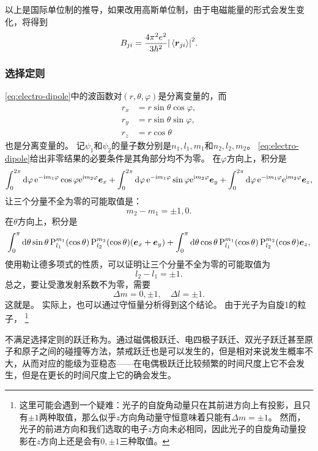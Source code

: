 以上是国际单位制的推导，如果改用高斯单位制，由于电磁能量的形式会发生变化，将得到
\begin{equation}
    B_{ji} = \frac{4\pi^2 e^2}{3 \hbar^2} \abs{\expval*{\vb*{r}_{ji}}}^2.
\end{equation}

\subsubsection{选择定则}

\eqref{eq:electro-dipole}中的波函数对$(r, \theta, \varphi)$是分离变量的，而
\[
    \begin{aligned}
        r_x &= r \sin \theta \cos \varphi, \\
        r_y &= r \sin \theta \sin \varphi, \\
        r_z &= r \cos \theta 
    \end{aligned}
\]
也是分离变量的。
记$\psi_1$和$\psi_2$的量子数分别是$n_1, l_1, m_1$和$n_2, l_2, m_2$。
\eqref{eq:electro-dipole}给出非零结果的必要条件是其角部分均不为零。
在$\varphi$方向上，积分是
\[
    \int_0^{2\pi} \dd{\varphi} \mathrm{e}^{ - \mathrm{i} m_1 \varphi} \cos \varphi \mathrm{e}^{\mathrm{i} m_2 \varphi} \vb*{e}_x + \int_0^{2\pi} \dd{\varphi} \mathrm{e}^{ - \mathrm{i} m_1 \varphi} \sin \varphi \mathrm{e}^{\mathrm{i} m_2 \varphi} \vb*{e}_y + \int_0^{2\pi} \dd{\varphi} \mathrm{e}^{ - \mathrm{i} m_1 \varphi} \mathrm{e}^{\mathrm{i} m_2 \varphi} \vb*{e}_z,
\]
让三个分量不全为零的可能取值是：
\[
    m_2 - m_1 = \pm 1, 0.
\]
在$\theta$方向上，积分是
\[
    \int_0^\pi \dd{\theta} \sin \theta \operatorname{P}_{l_1}^{m_1} (\cos \theta) \operatorname{P}_{l_2}^{m_2} (\cos \theta) (\vb*{e}_x + \vb*{e}_y) + \int_0^\pi \dd{\theta} \cos \theta \operatorname{P}_{l_1}^{m_1} (\cos \theta) \operatorname{P}_{l_2}^{m_2} (\cos \theta) \vb*{e}_z,
\]
使用勒让德多项式的性质，可以证明让三个分量不全为零的可能取值为
\[
    l_2 - l_1 = \pm 1.
\]
总之，要让受激发射系数不为零，需要
\begin{equation}
    \Delta m = 0, \pm 1, \quad \Delta l = \pm 1.
\end{equation}
这就是。
实际上，也可以通过守恒量分析得到这个结论。
由于光子为自旋1的粒子，%
\footnote{这里可能会遇到一个疑难：光子的自旋角动量只在其前进方向上有投影，且只有$\pm 1$两种取值，那么似乎$z$方向角动量守恒意味着只能有$\Delta m = \pm 1$。
然而，光子的前进方向和我们选取的电子$z$方向未必相同，因此光子的自旋角动量投影在$z$方向上还是会有$0, \pm 1$三种取值。
}%

不满足选择定则的跃迁称为。通过磁偶极跃迁、电四极子跃迁、双光子跃迁甚至原子和原子之间的碰撞等方法，禁戒跃迁也是可以发生的，但是相对来说发生概率不大，从而对应的能级为亚稳态——在电偶极跃迁比较频繁的时间尺度上它不会发生，但是在更长的时间尺度上它的确会发生。

